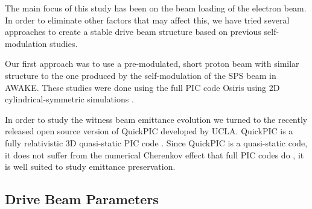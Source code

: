 \documentclass[aps,prstab,reprint,amsmath,amssymb,groupedaddress]{revtex4-1}
\begin{document}
The main focus of this study has been on the beam loading of the electron beam. In order to eliminate other factors
that may affect this, we have tried several approaches to create a stable drive beam structure based on previous self-
modulation studies.

Our first approach was to use a pre-modulated, short proton beam with similar structure to the one produced by the
self-modulation of the SPS beam in AWAKE. These studies were done using the full PIC code Osiris \cite{fonseca:2002}
using 2D cylindrical-symmetric simulations \cite{berglyd_olsen:2015, berglyd_olsen:2016}.


In order to study the witness beam emittance evolution we turned to the recently released open source version of
QuickPIC developed by UCLA. QuickPIC is a fully relativistic 3D quasi-static PIC code \cite{huang:2006, an:2013}.
Since QuickPIC is a quasi-static code, it does not suffer from the numerical Cherenkov effect that full PIC codes do
\cite{godfrey:1974,lehe:2013}, it is well suited to study emittance preservation.

\subsection[\label{S:M:Setup}]{Drive Beam Parameters}
\end{document}
